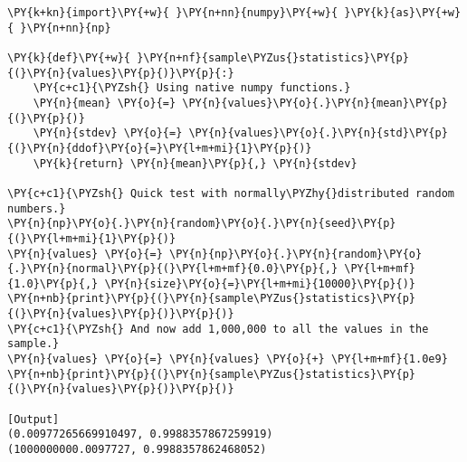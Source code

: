 \begin{Verbatim}[label=\makebox{\href{https://github.com/unipi-physics-labs/statnotes/tree/main/snippy/sample_stat4.py}{https://github.com/.../sample\_stat4.py}},commandchars=\\\{\}]
\PY{k+kn}{import}\PY{+w}{ }\PY{n+nn}{numpy}\PY{+w}{ }\PY{k}{as}\PY{+w}{ }\PY{n+nn}{np}

\PY{k}{def}\PY{+w}{ }\PY{n+nf}{sample\PYZus{}statistics}\PY{p}{(}\PY{n}{values}\PY{p}{)}\PY{p}{:}
    \PY{c+c1}{\PYZsh{} Using native numpy functions.}
    \PY{n}{mean} \PY{o}{=} \PY{n}{values}\PY{o}{.}\PY{n}{mean}\PY{p}{(}\PY{p}{)}
    \PY{n}{stdev} \PY{o}{=} \PY{n}{values}\PY{o}{.}\PY{n}{std}\PY{p}{(}\PY{n}{ddof}\PY{o}{=}\PY{l+m+mi}{1}\PY{p}{)}
    \PY{k}{return} \PY{n}{mean}\PY{p}{,} \PY{n}{stdev}

\PY{c+c1}{\PYZsh{} Quick test with normally\PYZhy{}distributed random numbers.}
\PY{n}{np}\PY{o}{.}\PY{n}{random}\PY{o}{.}\PY{n}{seed}\PY{p}{(}\PY{l+m+mi}{1}\PY{p}{)}
\PY{n}{values} \PY{o}{=} \PY{n}{np}\PY{o}{.}\PY{n}{random}\PY{o}{.}\PY{n}{normal}\PY{p}{(}\PY{l+m+mf}{0.0}\PY{p}{,} \PY{l+m+mf}{1.0}\PY{p}{,} \PY{n}{size}\PY{o}{=}\PY{l+m+mi}{10000}\PY{p}{)}
\PY{n+nb}{print}\PY{p}{(}\PY{n}{sample\PYZus{}statistics}\PY{p}{(}\PY{n}{values}\PY{p}{)}\PY{p}{)}
\PY{c+c1}{\PYZsh{} And now add 1,000,000 to all the values in the sample.}
\PY{n}{values} \PY{o}{=} \PY{n}{values} \PY{o}{+} \PY{l+m+mf}{1.0e9}
\PY{n+nb}{print}\PY{p}{(}\PY{n}{sample\PYZus{}statistics}\PY{p}{(}\PY{n}{values}\PY{p}{)}\PY{p}{)}

[Output]
(0.00977265669910497, 0.9988357867259919)
(1000000000.0097727, 0.9988357862468052)
\end{Verbatim}
